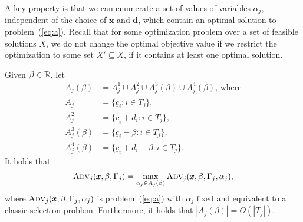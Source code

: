 A key property is that we can enumerate a set of values of variables $\alpha_j$, independent of the choice of $\pmb{x}$ and $\pmb{d}$, which contain an optimal solution to problem~(\ref{eq:a}). Recall that for some optimization problem over a set of feasible solutions $X$, we do not change the optimal objective value if we restrict the optimization to some set $X'\subseteq X$, if it contains at least one optimal solution.
\begin{lemma}
\label{lemma:alpha_j_discrete}
  Given $\beta \in \mathbb{R}$, let
  \begin{align*}
    A_j(\beta) &= A^1_j \cup A^2_j \cup A^3_j(\beta) \cup A^4_j(\beta) \text{, where}  \\
    A^1_j &= \{ \underline{c}_i : i\in T_j \}, \\
    A^2_j &= \{  \underline{c}_i + d_i  : i \in T_j \},  \\
    A^3_j(\beta) &= \{\underline{c}_i - \beta : i\in T_j\}, \\
    A^4_j(\beta) &= \{\underline{c}_i +d_i - \beta : i \in T_j \}.
    \end{align*}
  It holds that 
  \[ \textsc{Adv}_j(\pmb{x},\beta,\Gamma_j) = \max_{\alpha_j \in A_j(\beta)} \textsc{Adv}_j(\pmb{x},\beta,\Gamma_j,\alpha_j), \]
  where $\textsc{Adv}_j(\pmb{x},\beta,\Gamma_j,\alpha_j)$ is problem~(\ref{eq:a}) with $\alpha_j$ fixed and 
  equivalent to a classic selection problem. Furthermore, it holds that $|A_j(\beta)| = O(|T_j|)$.
\end{lemma}
